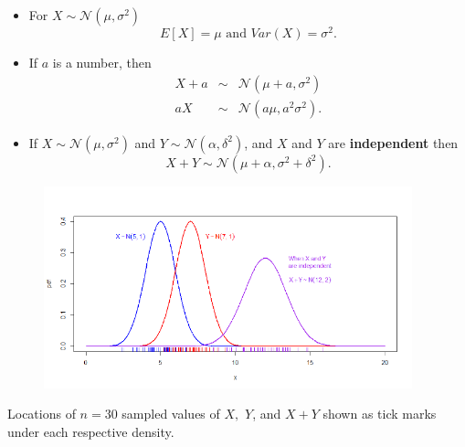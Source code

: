 \documentclass[notes=show,smaller,handout]{beamer}\usepackage[]{graphicx}\usepackage[]{color}
\newcommand{\N}{\mathcal{N}}
\newenvironment{stepitemize}{\begin{itemize}[<+->]}{\end{itemize} }
\begin{document}
\begin{frame}{\subsecname}


\begin{stepitemize}
\item For $X\sim \N\left( \mu ,\sigma ^{2}\right) $
\begin{equation*}
E\left[ X\right] =\mu \text{ and }Var\left( X\right) =\sigma ^{2}.
\end{equation*}

\item If $a$ is a number, then
\begin{eqnarray*}
X+a &\sim &\N\left( \mu +a,\sigma ^{2}\right) \\
aX &\sim &\N\left( a\mu ,a^{2}\sigma ^{2}\right).
\end{eqnarray*}

\item If $X\sim \N\left( \mu ,\sigma ^{2}\right) $ and $Y\sim \N\left( \alpha
,\delta ^{2}\right) $, and $X$ and $Y$ are \textbf{independent} then%
\begin{equation*}
X+Y\sim \N\left( \mu +\alpha ,\sigma ^{2}+\delta ^{2}\right).
\end{equation*}

\end{stepitemize}

\end{frame}%

\begin{frame}{\subsecname}



\begin{figure}[ptb]\centering
\includegraphics[width=0.95\textwidth,height=0.7\textheight]{img/sum_of_two_independent_normals_with_rug__1.pdf}%
\end{figure}


Locations of $n=30$ sampled values of $X,$ $Y$, and $X+Y$ shown as tick marks under each respective density.

\end{frame}%
\end{document}

